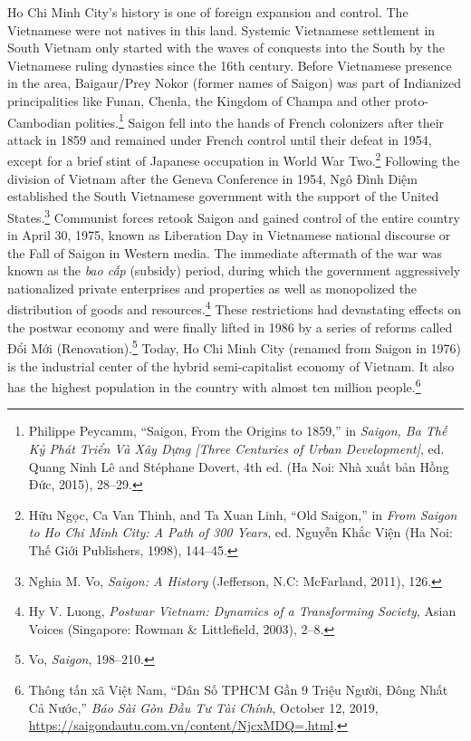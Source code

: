 Ho Chi Minh City's history is one of foreign expansion and control. The Vietnamese were not natives in this land. Systemic Vietnamese settlement in South Vietnam only started with the waves of conquests into the South by the Vietnamese ruling dynasties since the 16th century. Before Vietnamese presence in the area, Baigaur/Prey Nokor (former names of Saigon) was part of Indianized principalities like Funan, Chenla, the Kingdom of Champa and other proto-Cambodian polities.\footnote{Philippe Peycamm, “Saigon, From the Origins to 1859,” in \textit{Saigon, Ba Thế Kỷ Phát Triển Và Xây Dựng [Three Centuries of Urban Development]}, ed. Quang Ninh Lê and Stéphane Dovert, 4th ed. (Ha Noi: Nhà xuất bản Hồng Đức, 2015), 28–29.} Saigon fell into the hands of French colonizers after their attack in 1859 and remained under French control until their defeat in 1954, except for a brief stint of Japanese occupation in World War Two.\footnote{Hữu Ngọc, Ca Van Thinh, and Ta Xuan Linh, “Old Saigon,” in \textit{From Saigon to Ho Chi Minh City: A Path of 300 Years}, ed. Nguyễn Khắc Viện (Ha Noi: Thế Giới Publishers, 1998), 144–45.} Following the division of Vietnam after the Geneva Conference in 1954, Ngô Đình Diệm established the South Vietnamese government with the support of the United States.\footnote{Nghia M. Vo, \textit{Saigon: A History} (Jefferson, N.C: McFarland, 2011), 126.} Communist forces retook Saigon and gained control of the entire country in April 30, 1975, known as Liberation Day in Vietnamese national discourse or the Fall of Saigon in Western media. The immediate aftermath of the war was known as the \textit{bao cấp} (subsidy) period, during which the government aggressively nationalized private enterprises and properties as well as monopolized the distribution of goods and resources.\footnote{Hy V. Luong, \textit{Postwar Vietnam: Dynamics of a Transforming Society}, Asian Voices (Singapore: Rowman \& Littlefield, 2003), 2–8.} These restrictions had devastating effects on the postwar economy and were finally lifted in 1986 by a series of reforms called Đổi Mới (Renovation).\footnote{Vo, \textit{Saigon}, 198–210.} Today, Ho Chi Minh City (renamed from Saigon in 1976) is the industrial center of the hybrid semi-capitalist economy of Vietnam. It also has the highest population in the country with almost ten million people.\footnote{Thông tấn xã Việt Nam, “Dân Số TPHCM Gần 9 Triệu Người, Đông Nhất Cả Nước,” \textit{Báo Sài Gòn Đầu Tư Tài Chính}, October 12, 2019, \url{https://saigondautu.com.vn/content/NjcxMDQ=.html}.}  

